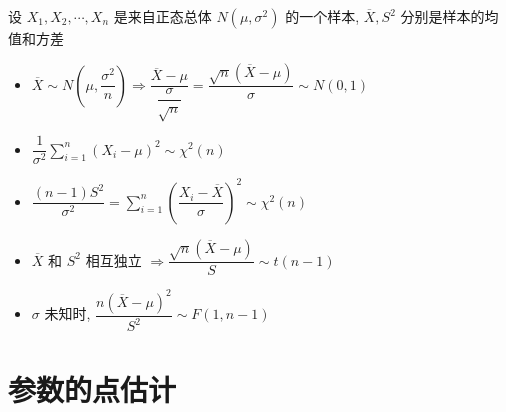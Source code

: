 \begin{corollary}[正态总体推论]
	
	设 $X_{1}, X_{2}, \cdots, X_{n}$ 是来自正态总体 $N(\mu,\sigma^{2})$ 的一个样本, $\overline{X}, S^2$ 分别是样本的均值和方差
	\begin{itemize}
		\item $\overline{X}\sim N(\mu,\dfrac{\sigma^2}{n})\Rightarrow \dfrac{\overline{X}-\mu}{\dfrac{\sigma}{\sqrt{n}}}=\dfrac{\sqrt{n}(\overline{X}-\mu)}{\sigma}\sim N(0,1)$
		\item $\dfrac{1}{\sigma^{2}}\sum\limits_{i=1}^{n}(X_{i}-\mu)^{2}\sim \chi^{2}(n)$
		\item $\dfrac{(n-1)S^2}{\sigma^2}=\sum\limits_{i=1}^{n}(\dfrac{X_{i}-\overline{X}}{\sigma})^2\sim \chi^2(n)$
		\item $\overline{X}$ 和 $S^{2}$ 相互独立 $\Rightarrow \dfrac{\sqrt{n}(\overline{X}-\mu)}{S}\sim t(n-1)$
		\item $\sigma$ 未知时, $\dfrac{n(\overline{X}-\mu)^2}{S^2}\sim F(1,n-1)$
	\end{itemize}
\end{corollary}


\section{参数的点估计}

